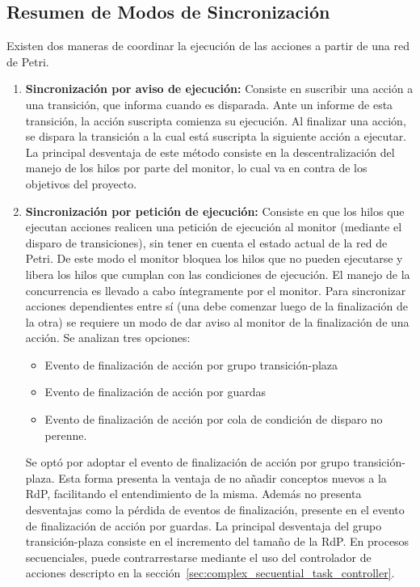 \subsection{Resumen de Modos de Sincronización}
\label{sec:resumen_sincronizacion}
Existen dos maneras de coordinar la ejecución de las acciones a partir de una
red de Petri.\\ 
\begin{enumerate}
  \item \textbf{Sincronización por aviso de ejecución: } Consiste en suscribir
  una acción a una transición, que informa cuando es disparada. Ante un informe
  de esta transición, la acción suscripta comienza su ejecución.
  Al finalizar una acción, se dispara la transición a la cual está suscripta la
  siguiente acción a ejecutar.
  La principal desventaja de este método consiste en la descentralización del
  manejo de los hilos por parte del monitor, lo cual va en contra de los objetivos del
  proyecto.
  \item \textbf{Sincronización por petición de ejecución: } Consiste en que los
  hilos que ejecutan acciones realicen una petición de ejecución al
  monitor (mediante el disparo de transiciones), sin tener en cuenta el estado
  actual de la red de Petri. De este modo el monitor bloquea los hilos que no
  pueden ejecutarse y libera los hilos que cumplan con las condiciones de
  ejecución. El manejo de la concurrencia es llevado a cabo íntegramente por el
  monitor.
  Para sincronizar acciones dependientes entre sí (una debe comenzar luego de
  la finalización de la otra) se requiere un modo de dar aviso al monitor de
  la finalización de una acción. Se analizan tres opciones:
  \begin{itemize}
      \item Evento de finalización de acción por grupo transición-plaza
	  \item Evento de finalización de acción por guardas
	  \item Evento de finalización de acción por cola de condición de disparo no
	  perenne.
  \end{itemize}
  Se optó por adoptar el evento de finalización de acción por grupo
  transición-plaza. Esta forma presenta la ventaja de no añadir
  conceptos nuevos a la RdP, facilitando el entendimiento de la misma. Además
  no presenta desventajas como la pérdida de eventos de finalización, presente
  en el evento de finalización de acción por guardas.
  La principal desventaja del grupo transición-plaza consiste en el incremento
  del tamaño de la RdP. En procesos secuenciales, puede contrarrestarse mediante
  el uso del controlador de acciones descripto en la
  sección~\ref{sec:complex_secuential_task_controller}.
\end{enumerate}
 

 
 
 
 
